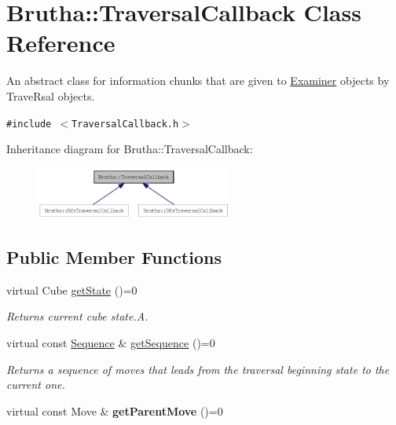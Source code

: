 \hypertarget{classBrutha_1_1TraversalCallback}{
\section{Brutha::TraversalCallback Class Reference}
\label{classBrutha_1_1TraversalCallback}
}
An abstract class for information chunks that are given to \hyperlink{classBrutha_1_1Examiner}{Examiner} objects by TraveRsal objects.  


{\tt \#include $<$TraversalCallback.h$>$}

Inheritance diagram for Brutha::TraversalCallback:\nopagebreak
\begin{figure}[H]
\begin{center}
\leavevmode
\includegraphics[width=183pt]{classBrutha_1_1TraversalCallback__inherit__graph}
\end{center}
\end{figure}
\subsection*{Public Member Functions}
\begin{CompactItemize}
\item 
virtual Cube \hyperlink{classBrutha_1_1TraversalCallback_c037795e35fc6b1a2c65cb1e0e976356}{getState} ()=0
\begin{CompactList}\small\item\em Returns current cube state.A. \item\end{CompactList}\item 
virtual const \hyperlink{classBrutha_1_1Sequence}{Sequence} \& \hyperlink{classBrutha_1_1TraversalCallback_8946d090513db014bbf7b542dc70866c}{getSequence} ()=0
\begin{CompactList}\small\item\em Returns a sequence of moves that leads from the traversal beginning state to the current one. \item\end{CompactList}\item 
\hypertarget{classBrutha_1_1TraversalCallback_b0c7e8d859f10ad580c805e93555443d}{
virtual const Move \& \textbf{getParentMove} ()=0}
\label{classBrutha_1_1TraversalCallback_b0c7e8d859f10ad580c805e93555443d}

\end{CompactItemize}


